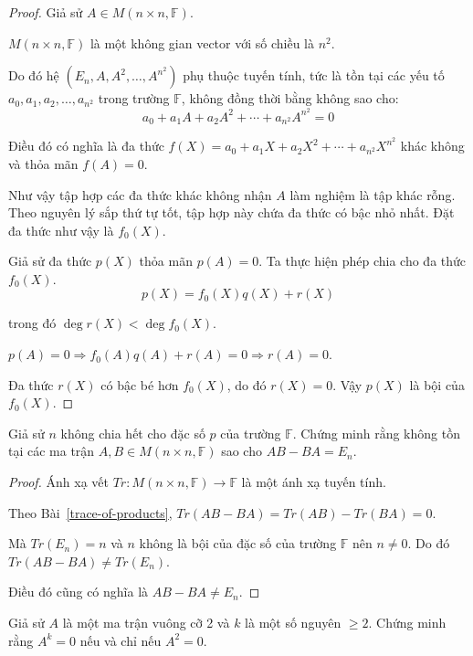 \documentclass[class=linearalgebra,crop=false]{standalone}
\begin{document}
\begin{proof}
    Giả sử $A\in M(n\times n,\mathbb{F})$.
    \par $M(n\times n,\mathbb{F})$ là một không gian vector với số chiều là $n^{2}$.
    \par Do đó hệ $(E_{n}, A, A^{2}, \ldots, A^{n^{2}})$ phụ thuộc tuyến tính, tức là tồn tại các yếu tố $a_{0}, a_{1}, a_{2}, \ldots, a_{n^{2}}$ trong trường $\mathbb{F}$, không đồng thời bằng không sao cho:
    \[
        a_{0} + a_{1}A + a_{2}A^{2} + \cdots + a_{n^{2}}A^{n^{2}} = 0
    \]
    \par Điều đó có nghĩa là đa thức $f(X) = a_{0} + a_{1}X + a_{2}X^{2} + \cdots + a_{n^{2}}X^{n^{2}}$ khác không và thỏa mãn $f(A) = 0$.
    \par Như vậy tập hợp các đa thức khác không nhận $A$ làm nghiệm là tập khác rỗng. Theo nguyên lý sắp thứ tự tốt, tập hợp này chứa đa thức có bậc nhỏ nhất. Đặt đa thức như vậy là $f_{0}(X)$.
    \par Giả sử đa thức $p(X)$ thỏa mãn $p(A) = 0$. Ta thực hiện phép chia cho đa thức $f_{0}(X)$.
    \[
        p(X) = f_{0}(X)q(X) + r(X)
    \]
    \par trong đó $\deg r(X) < \deg f_{0}(X)$.
    \par $p(A) = 0\Rightarrow f_{0}(A)q(A) + r(A) = 0 \Rightarrow r(A) = 0$.
    \par Đa thức $r(X)$ có bậc bé hơn $f_{0}(X)$, do đó $r(X) = 0$. Vậy $p(X)$ là bội của $f_{0}(X)$.
\end{proof}

\begin{exercise}
    Giả sử $n$ không chia hết cho đặc số $p$ của trường $\mathbb{F}$. Chứng minh rằng không tồn tại các ma trận $A, B\in M(n\times n, \mathbb{F})$ sao cho $AB - BA = E_{n}$.
\end{exercise}

\begin{proof}
    Ánh xạ vết $Tr: M(n\times n, \mathbb{F})\rightarrow \mathbb{F}$ là một ánh xạ tuyến tính.
    \par Theo Bài~\ref{trace-of-products}, $Tr(AB - BA) = Tr(AB) - Tr(BA) = 0$.
    \par Mà $Tr(E_{n}) = n$ và $n$ không là bội của đặc số của trường $\mathbb{F}$ nên $n\ne 0$. Do đó $Tr(AB - BA)\ne Tr(E_{n})$.
    \par Điều đó cũng có nghĩa là $AB - BA \ne E_{n}$.
\end{proof}

\begin{exercise}
    Giả sử $A$ là một ma trận vuông cỡ 2 và $k$ là một số nguyên $\ge 2$. Chứng minh rằng $A^{k} = 0$ nếu và chỉ nếu $A^{2} = 0$.
\end{exercise}
\end{document}
